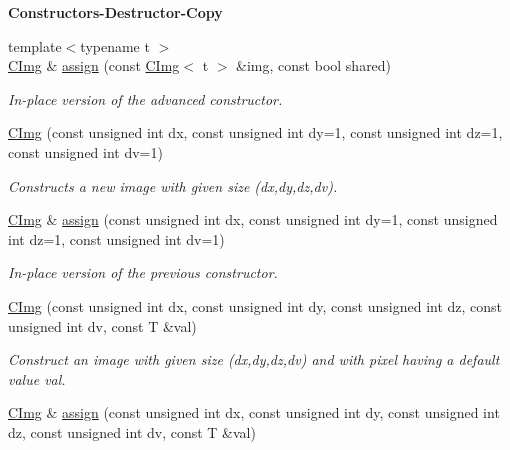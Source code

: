 \begin{Indent}{\bf Constructors-\/Destructor-\/Copy}
\begin{DoxyCompactItemize}
\item 
{\footnotesize template$<$typename t $>$ }\\\hyperlink{structcimg__library_1_1_c_img}{CImg} \& \hyperlink{structcimg__library_1_1_c_img_a8ef44313e56a0df4cde616f289422eae}{assign} (const \hyperlink{structcimg__library_1_1_c_img}{CImg}$<$ t $>$ \&img, const bool shared)
\begin{DoxyCompactList}\small\item\em In-\/place version of the advanced constructor. \item\end{DoxyCompactList}\item 
\hyperlink{structcimg__library_1_1_c_img_a3c57bd9536e4cc2df00a902a377f1b3b}{CImg} (const unsigned int dx, const unsigned int dy=1, const unsigned int dz=1, const unsigned int dv=1)
\begin{DoxyCompactList}\small\item\em Constructs a new image with given size ({\ttfamily dx},{\ttfamily dy},{\ttfamily dz},{\ttfamily dv}). \item\end{DoxyCompactList}\item 
\hyperlink{structcimg__library_1_1_c_img}{CImg} \& \hyperlink{structcimg__library_1_1_c_img_a32e4857acca9063f247a025e163e41b8}{assign} (const unsigned int dx, const unsigned int dy=1, const unsigned int dz=1, const unsigned int dv=1)
\begin{DoxyCompactList}\small\item\em In-\/place version of the previous constructor. \item\end{DoxyCompactList}\item 
\hyperlink{structcimg__library_1_1_c_img_ad024111e98670fe76bea4012a182790d}{CImg} (const unsigned int dx, const unsigned int dy, const unsigned int dz, const unsigned int dv, const T \&val)
\begin{DoxyCompactList}\small\item\em Construct an image with given size ({\ttfamily dx},{\ttfamily dy},{\ttfamily dz},{\ttfamily dv}) and with pixel having a default value {\ttfamily val}. \item\end{DoxyCompactList}\item 
\hyperlink{structcimg__library_1_1_c_img}{CImg} \& \hyperlink{structcimg__library_1_1_c_img_ac7f3c90ee5f43317abfbc6a7bb3d4ea6}{assign} (const unsigned int dx, const unsigned int dy, const unsigned int dz, const unsigned int dv, const T \&val)

\end{DoxyCompactItemize}
\end{Indent}
